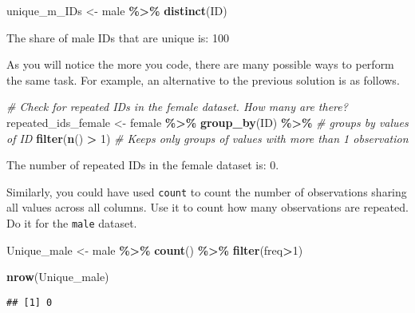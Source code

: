 \documentclass[
]{book}
\newenvironment{Shaded}{\begin{snugshade}}{\end{snugshade}}
\newcommand{\CommentTok}[1]{\textcolor[rgb]{0.56,0.35,0.01}{\textit{#1}}}
\newcommand{\DecValTok}[1]{\textcolor[rgb]{0.00,0.00,0.81}{#1}}
\newcommand{\FunctionTok}[1]{\textcolor[rgb]{0.13,0.29,0.53}{\textbf{#1}}}
\newcommand{\NormalTok}[1]{#1}
\newcommand{\OtherTok}[1]{\textcolor[rgb]{0.56,0.35,0.01}{#1}}
\newcommand{\SpecialCharTok}[1]{\textcolor[rgb]{0.81,0.36,0.00}{\textbf{#1}}}
\begin{document}
\begin{Shaded}
\begin{Highlighting}[]
\NormalTok{unique\_m\_IDs }\OtherTok{\textless{}{-}}\NormalTok{ male }\SpecialCharTok{\%\textgreater{}\%}
  \FunctionTok{distinct}\NormalTok{(ID)}
\end{Highlighting}
\end{Shaded}

The share of male IDs that are unique is: 100

As you will notice the more you code, there are many possible ways to perform the same task. For example, an alternative to the previous solution is as follows.

\begin{Shaded}
\begin{Highlighting}[]
\CommentTok{\# Check for repeated IDs in the female dataset. How many are there?}
\NormalTok{repeated\_ids\_female }\OtherTok{\textless{}{-}}\NormalTok{ female }\SpecialCharTok{\%\textgreater{}\%}
  \FunctionTok{group\_by}\NormalTok{(ID) }\SpecialCharTok{\%\textgreater{}\%} \CommentTok{\# groups by values of ID}
  \FunctionTok{filter}\NormalTok{(}\FunctionTok{n}\NormalTok{() }\SpecialCharTok{\textgreater{}} \DecValTok{1}\NormalTok{) }\CommentTok{\# Keeps only groups of values with more than 1 observation}
\end{Highlighting}
\end{Shaded}

The number of repeated IDs in the female dataset is: 0.

Similarly, you could have used \texttt{count} to count the number of observations sharing all values across all columns. Use it to count how many observations are repeated. Do it for the \texttt{male} dataset.

\begin{Shaded}
\begin{Highlighting}[]
\NormalTok{Unique\_male }\OtherTok{\textless{}{-}}\NormalTok{ male }\SpecialCharTok{\%\textgreater{}\%}
  \FunctionTok{count}\NormalTok{() }\SpecialCharTok{\%\textgreater{}\%} 
  \FunctionTok{filter}\NormalTok{(freq}\SpecialCharTok{\textgreater{}}\DecValTok{1}\NormalTok{)}

\FunctionTok{nrow}\NormalTok{(Unique\_male)}
\end{Highlighting}
\end{Shaded}

\begin{verbatim}
## [1] 0
\end{verbatim}
\end{document}

